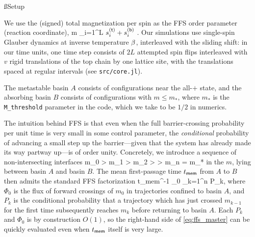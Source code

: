 \documentclass[12pt]{article}
\newcommand{\tmem}{t_{\sf mem}}
\begin{document}
\ss{Setup}

We use the (signed) total magnetization per spin as the FFS order parameter (reaction coordinate),
\be \label{eq:m_def} m \equiv {} \sum_{i=1}^L \( s^{(\sft)}_i + s^{(\sfb)}_i \) \in [-1,+1].\ee
Our simulations use single-spin Glauber dynamics at inverse temperature $\beta$, interleaved with the sliding shift: in our time units, one time step consists of $2L$ attempted spin flips interleaved with $v$ rigid translations of the top chain by one lattice site, with the translations spaced at regular intervals (see \texttt{src/core.jl}).

The metastable basin $A$ consists of configurations near the all-$+$ state, and the absorbing basin $B$ consists of configurations with $m \leq m_*$, where $m_*$ is the \texttt{ M\_threshold} parameter in the code, which we take to be $1/2$ in numerics. 

\medskip 

The intuition behind FFS is that even when the full barrier-crossing probability per unit time is very small in some control parameter, the {\it conditional} probability of advancing a small step up the barrier---given that the system has already made its way partway up---is of order unity. Concretely, we introduce a sequence of non-intersecting interfaces
\be \label{eq:interfaces} m_0 > m_1 > m_2 > \cdots > m_n = m_*\ee
in the $m$, lying between basin $A$ and basin $B$. The mean first-passage time $\tmem$ from $A$ to $B$ then admits the standard FFS factorization \cite{allen2009forward}
\be \label{eq:ffs_master} \tmem^{-1} \approx \Phi_0 \prod_{k=1}^n P_k,\ee
where $\Phi_0$ is the flux of forward crossings of $m_0$ in trajectories confined to basin $A$, and $P_k$ is the conditional probability that a trajectory which has just crossed $m_{k-1}$ for the first time subsequently reaches $m_k$ before returning to basin $A$. Each $P_k$ and $\Phi_0$ is by construction $O(1)$, so the right-hand side of \eqref{eq:ffs_master} can be quickly evaluated even when $\tmem$ itself is very large.

\end{document}
